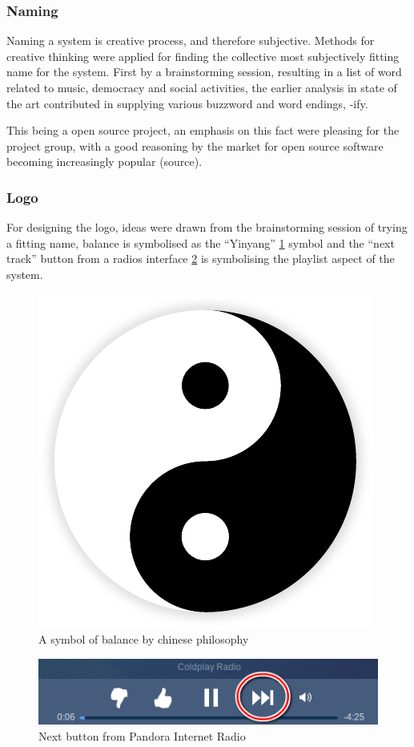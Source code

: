 
\subsubsection{Naming}
Naming a system is creative process, and therefore subjective. Methods for creative thinking were applied for finding the collective most subjectively fitting name for the system. First by a brainstorming session, resulting in a list of word related to music, democracy and social activities, the earlier analysis in state of the art contributed in supplying various buzzword and word endings, -ify.

This being a open source project, an emphasis on this fact were pleasing for the project group, with a good reasoning by the market for open source software becoming increasingly popular (source).

\subsubsection{Logo}
For designing the logo, ideas were drawn from the brainstorming session of trying a fitting name, balance is symbolised as the \enquote{Yinyang} \cref{fig:yinyang} symbol and the \enquote{next track} button from a radios interface \cref{fig:vlc} is symbolising the playlist aspect of the system.

\begin{figure}
  \centering
  \includegraphics[width=0.2\linewidth]{Images/Yin-Yang}
  \caption{A symbol of balance by chinese philosophy~\cite{yinyangsource} }
  \label{fig:yinyang}
\end{figure}

\begin{figure}
  \centering
  \includegraphics[scale=0.7]{Images/pandoraNext.png}
  \caption{Next button from Pandora Internet Radio}
  \label{fig:vlc}
\end{figure}

